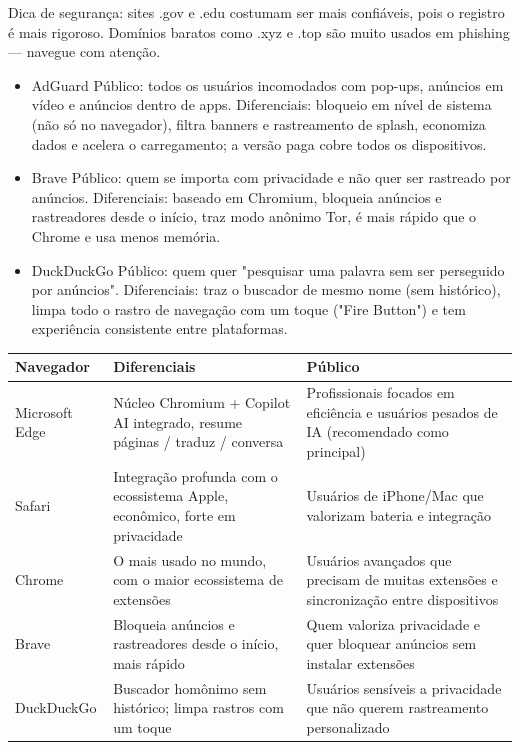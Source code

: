 Dica de segurança: sites .gov e .edu costumam ser mais confiáveis, pois o registro é mais rigoroso. Domínios baratos como .xyz e .top são muito usados em phishing — navegue com atenção.


\begin{itemize}
  \item AdGuard Público: todos os usuários incomodados com pop-ups, anúncios em vídeo e anúncios dentro de apps. Diferenciais: bloqueio em nível de sistema (não só no navegador), filtra banners e rastreamento de splash, economiza dados e acelera o carregamento; a versão paga cobre todos os dispositivos.
\end{itemize}


\begin{itemize}
  \item Brave Público: quem se importa com privacidade e não quer ser rastreado por anúncios. Diferenciais: baseado em Chromium, bloqueia anúncios e rastreadores desde o início, traz modo anônimo Tor, é mais rápido que o Chrome e usa menos memória.
  \item DuckDuckGo Público: quem quer "pesquisar uma palavra sem ser perseguido por anúncios". Diferenciais: traz o buscador de mesmo nome (sem histórico), limpa todo o rastro de navegação com um toque ("Fire Button") e tem experiência consistente entre plataformas.
\end{itemize}


\begin{center}
\begin{tabularx}{\linewidth}{|X|X|X|}
\hline
\textbf{Navegador} & \textbf{Diferenciais} & \textbf{Público} \tabularnewline
\hline
Microsoft Edge & Núcleo Chromium + Copilot AI integrado, resume páginas / traduz / conversa & Profissionais focados em eficiência e usuários pesados de IA (recomendado como principal) \tabularnewline
Safari & Integração profunda com o ecossistema Apple, econômico, forte em privacidade & Usuários de iPhone/Mac que valorizam bateria e integração \tabularnewline
Chrome & O mais usado no mundo, com o maior ecossistema de extensões & Usuários avançados que precisam de muitas extensões e sincronização entre dispositivos \tabularnewline
Brave & Bloqueia anúncios e rastreadores desde o início, mais rápido & Quem valoriza privacidade e quer bloquear anúncios sem instalar extensões \tabularnewline
DuckDuckGo & Buscador homônimo sem histórico; limpa rastros com um toque & Usuários sensíveis a privacidade que não querem rastreamento personalizado \tabularnewline
\hline
\end{tabularx}
\end{center}

